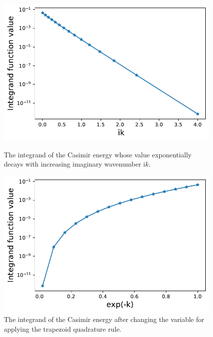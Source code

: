 \begin{figure}[H]
    \begin{minipage}[b]{.47\textwidth}
    \centering
    \includegraphics[width=1\textwidth]{figures/integ_exp_decay.pdf}
    \caption{The integrand of the Casimir energy whose value exponentially decays with increasing imaginary wavenumber $\mathrm{i}k$.}
    \label{The integrand decays exponentially}
    \end{minipage}
    \hfill
    \begin{minipage}[b]{.47\textwidth}
    \centering
    \includegraphics[width=1\textwidth]{figures/integ_exp_not_decay.pdf}
    \caption{The integrand of the Casimir energy after changing the variable for applying the trapezoid quadrature rule.}
    \label{The integrand does not decay exponentially}
    \end{minipage}
    \end{figure}

